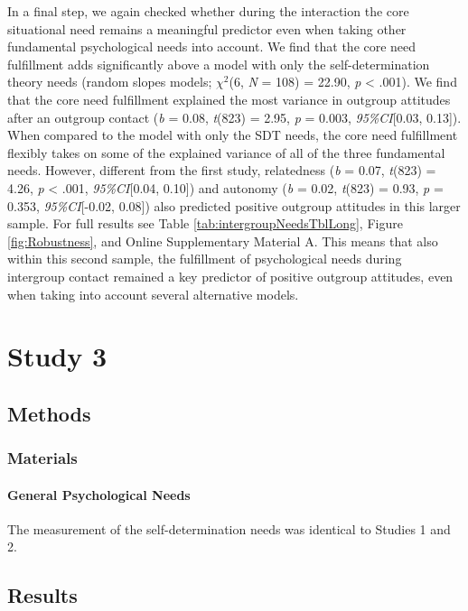 In a final step, we again checked whether during the interaction the
core situational need remains a meaningful predictor even when taking
other fundamental psychological needs into account. We find that the
core need fulfillment adds significantly above a model with only the
self-determination theory needs (random slopes models; \(\chi^2\)(6,
\textit{N} = 108) = 22.90, \textit{p} \textless{} .001). We find that
the core need fulfillment explained the most variance in outgroup
attitudes after an outgroup contact (\textit{b} = 0.08, \textit{t}(823)
= 2.95, \textit{p} = 0.003, \textit{95\%CI}{[}0.03, 0.13{]}). When
compared to the model with only the SDT needs, the core need fulfillment
flexibly takes on some of the explained variance of all of the three
fundamental needs. However, different from the first study, relatedness
(\textit{b} = 0.07, \textit{t}(823) = 4.26, \textit{p} \textless{} .001,
\textit{95\%CI}{[}0.04, 0.10{]}) and autonomy (\textit{b} = 0.02,
\textit{t}(823) = 0.93, \textit{p} = 0.353, \textit{95\%CI}{[}-0.02,
0.08{]}) also predicted positive outgroup attitudes in this larger
sample. For full results see Table \ref{tab:intergroupNeedsTblLong},
Figure \ref{fig:Robustness}, and Online Supplementary Material A. This
means that also within this second sample, the fulfillment of
psychological needs during intergroup contact remained a key predictor
of positive outgroup attitudes, even when taking into account several
alternative models.

\section{Study 3}

\subsection{Methods}

\subsubsection{Materials}

\paragraph{General Psychological Needs}

The measurement of the self-determination needs was identical to Studies
1 and 2.

\subsection{Results}


